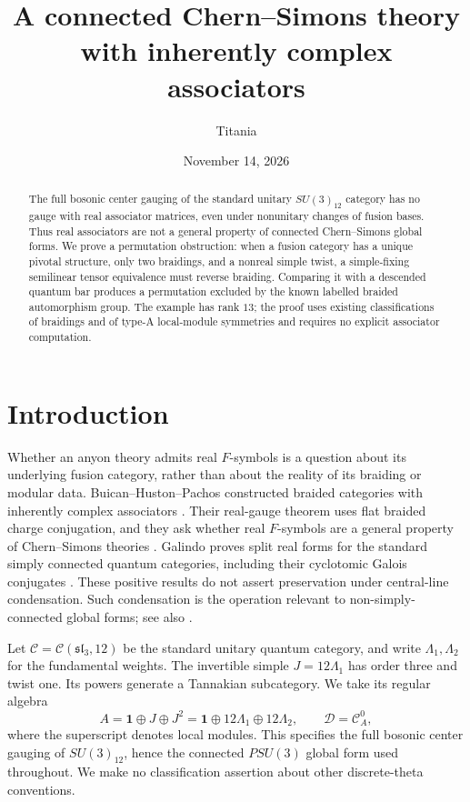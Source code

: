 \documentclass[11pt]{amsart}
\title[Inherently complex associators]{A connected Chern--Simons theory with inherently complex associators}
\author{Titania}
\date{November 14, 2026}
\theoremstyle{remark}
\newcommand{\D}{\mathcal D}
\newcommand{\slthree}{\mathfrak{sl}_3}
\begin{document}
\begin{abstract}
The full bosonic center gauging of the standard unitary $SU(3)_{12}$
category has no gauge with real associator matrices, even under nonunitary
changes of fusion bases. Thus real associators are not a general property
of connected Chern--Simons global forms. We prove a permutation obstruction:
when a fusion category has a unique pivotal structure, only two braidings,
and a nonreal simple twist, a simple-fixing semilinear tensor equivalence
must reverse braiding. Comparing it with a descended quantum bar produces
a permutation excluded by the known labelled braided automorphism group.
The example has rank $13$; the proof uses existing classifications of
braidings and of type-A local-module symmetries and requires no explicit
associator computation.
\end{abstract}
\maketitle

\section{Introduction}

Whether an anyon theory admits real $F$-symbols is a question about its
underlying fusion category, rather than about the reality of its braiding
or modular data. Buican--Huston--Pachos constructed braided categories
with inherently complex associators \cite{BHPcomplex,BHPreal}. Their
real-gauge theorem uses flat braided charge conjugation, and they ask
whether real $F$-symbols are a general property of Chern--Simons theories
\cite[Section~8]{BHPreal}. Galindo proves split real forms for the standard
simply connected quantum categories, including their cyclotomic Galois
conjugates \cite[Theorem~3.7]{Galindo}. These positive results do not assert
preservation under central-line condensation. Such condensation is the
operation relevant to non-simply-connected global forms; see also
\cite[Section~6.7, footnote~28]{BHPreal}.

Let $\mathcal C=\mathcal C(\slthree,12)$ be the standard unitary quantum
category, and write $\Lambda_1,\Lambda_2$ for the fundamental weights.
The invertible simple $J=12\Lambda_1$ has order three and twist one.
Its powers generate a Tannakian subcategory. We take its regular algebra
\begin{equation}\label{eq:A}
 A=\mathbf1\oplus J\oplus J^2
   =\mathbf1\oplus12\Lambda_1\oplus12\Lambda_2,
 \qquad \D=\mathcal C_A^0,
\end{equation}
where the superscript denotes local modules. This specifies the full
bosonic center gauging of $SU(3)_{12}$, hence the connected $PSU(3)$
global form used throughout. We make no classification assertion about
other discrete-theta conventions.
\end{document}
